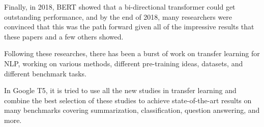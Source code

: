 Finally, in 2018, BERT \cite{devlin-etal-2019-bert} showed that a bi-directional transformer could get outstanding performance, and by the end of 2018, many researchers were convinced that this was the path forward given all of the impressive results that these papers and a few others showed.

Following these researches, there has been a burst of work on transfer learning for NLP, working on various methods, different pre-training ideas, datasets, and different benchmark tasks.

In Google T5, it is tried to use all the new studies in transfer learning and combine the best selection of these studies to achieve state-of-the-art results on many benchmarks covering summarization, classification, question answering, and more.